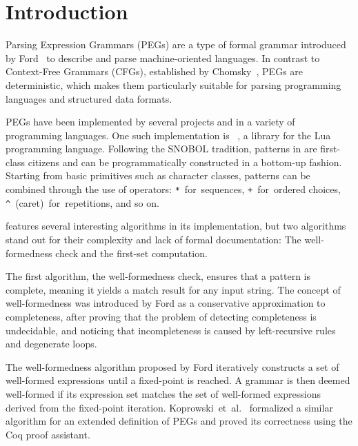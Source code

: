 \chapter{Introduction}



Parsing Expression Grammars (PEGs)
are a type of formal grammar
introduced by Ford~\cite{ford_parsing_2004}
to describe and parse machine-oriented languages.
In contrast to Context-Free Grammars (CFGs),
established by Chomsky~\cite{chomsky_three_1956},
PEGs are deterministic,
which makes them particularly suitable for parsing
programming languages and structured data formats.

PEGs have been implemented by several projects
and in a variety of programming languages.
One such implementation is
\lpeg{}~\cite{ierusalimschy_text_2009},
a library for the Lua programming language.
Following the SNOBOL tradition,
patterns in \lpeg{} are first-class citizens
and can be programmatically constructed in a bottom-up fashion.
Starting from basic primitives such as character classes,
patterns can be combined through the use of operators:
\texttt{*}~for~sequences,
\texttt{+}~for~ordered choices,
\texttt{\^}~(caret)~for~repetitions,
and so on.

\lpeg{}
features several interesting algorithms in its implementation,
but two algorithms stand out for their complexity
and lack of formal documentation:
The well-formedness check
and the first-set computation.

The first algorithm, the well-formedness check,
ensures that a pattern is complete,
meaning it yields a match result for any input string.
The concept of well-formedness
was introduced by Ford
as a conservative approximation to completeness,
after proving that the problem of detecting completeness is undecidable,
and noticing that incompleteness is caused by
left-recursive rules and degenerate loops.

The well-formedness algorithm proposed by Ford
iteratively constructs a set of well-formed expressions
until a fixed-point is reached.
A grammar is then deemed well-formed if its expression set
matches the set of well-formed expressions derived
from the fixed-point iteration.
Koprowski~et~al.~\cite{koprowski_trx_2011}
formalized a similar algorithm
for an extended definition of PEGs
and proved its correctness
using the Coq proof assistant.

